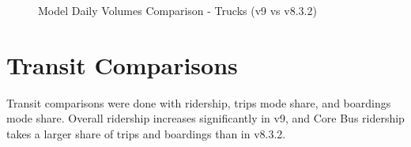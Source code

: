\documentclass[
  letterpaper,
  DIV=11,
  numbers=noendperiod,
  titlepage=false]{scrreprt}
\begin{document}
\begin{figure}
\begin{minipage}[t]{0.33\linewidth}
{{}

}

\end{minipage}%
%
\begin{minipage}[t]{0.33\linewidth}

{\centering 


}

\end{minipage}%

\caption{\label{fig-pdf-volume-truck-comparison}Model Daily Volumes
Comparison - Trucks (v9 vs v8.3.2)}

\end{figure}

\hypertarget{transit-comparisons}{%
\section{Transit Comparisons}\label{transit-comparisons}}

Transit comparisons were done with ridership, trips mode share, and
boardings mode share. Overall ridership increases significantly in v9,
and Core Bus ridership takes a larger share of trips and boardings than
in v8.3.2.
\end{document}
